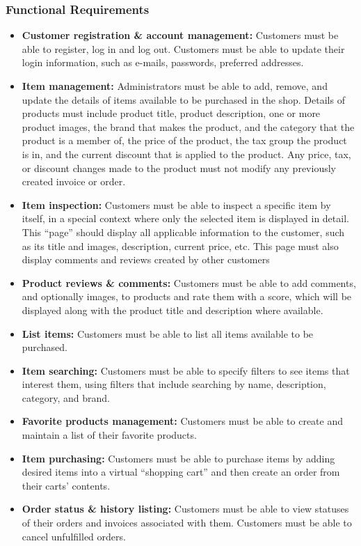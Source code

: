 \documentclass[twoside,a4paper,journal]{IEEEtran}
\begin{document}
\subsubsection{Functional Requirements}
\begin{itemize}
  \item \textbf{Customer registration \& account management:}
    Customers must be able to register, log in and log out. Customers
    must be able to update their login information, such as e-mails, passwords,
    preferred addresses.
  \item \textbf{Item management:} Administrators must be
    able to add, remove, and update the details of items available to be
    purchased in the shop. Details of products must include product title,
    product description, one or more product images, the brand that makes the
    product, and the category that the product is a member of, the price of the
    product, the tax
    group the product is in, and the current discount that is applied to the
    product. Any price, tax, or discount changes made to the product must not
    modify any previously created invoice or order.
  \item \textbf{Item inspection:} Customers must be able
    to inspect a specific item by itself, in a special context where only the
    selected item is displayed in detail. This ``page'' should display all applicable
    information to the customer, such as its title and images, description, current
    price, etc. This page must also display comments and reviews created by other
    customers
  \item \textbf{Product reviews \& comments:} Customers
    must be able to add comments, and optionally images, to products and rate them
    with a score, which will be displayed along with the product title and
    description where available.
  \item \textbf{List items:} Customers must be able to
   list all items available to be purchased.
  \item \textbf{Item searching:} Customers must be able to
    specify filters to see items that interest them, using filters that include
    searching by name, description, category, and brand.
  \item \textbf{Favorite products management:} Customers
   must be able to create and maintain a list of their favorite products.
  \item \textbf{Item purchasing:} Customers must be able
    to purchase items by adding desired items into a virtual ``shopping cart''
    and then create an order from their carts' contents.
  \item \textbf{Order status \& history listing:}
    Customers must be able to view statuses of
    their orders and invoices associated with them. Customers must be able to
    cancel unfulfilled orders.
\end{itemize}
\end{document}
